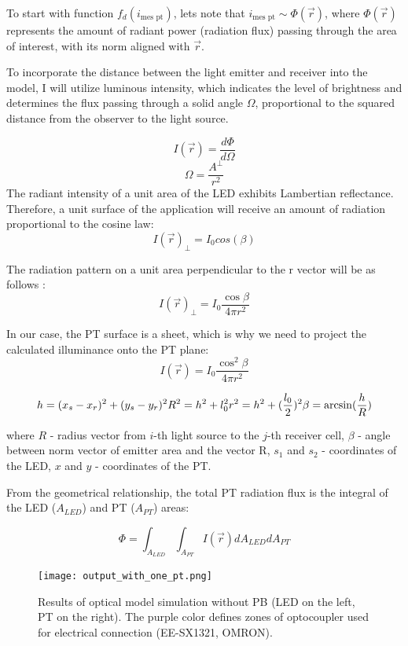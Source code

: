 To start with function $f_d(i_{\text{mes pt}})$, lets note that $i_{\text{mes pt}} 
\sim \Phi(\vec{r})$, where $\Phi(\vec{r})$ represents the amount of radiant power (radiation flux) passing through the area of interest, with its norm aligned with $\vec{r}$.

To incorporate the distance between the light emitter and receiver into the model, I will utilize luminous intensity, which indicates the level of brightness and determines the flux passing through a solid angle 
$\Omega$, proportional to the squared distance from the observer to the light source.

\[I(\vec{r}) = \frac{d\Phi}{d\Omega} \]
\[\Omega = \frac{A^\perp}{r^2}\]
The radiant intensity of a unit area of the LED exhibits Lambertian reflectance. 
Therefore, a unit surface of the application will receive an amount of radiation proportional to the cosine law:
\[I(\vec{r})_\perp = I_{0} cos (\beta)\]

The radiation pattern on a unit area perpendicular to the r vector will be as follows \cite{my_love_pressure_photosensor}:
\[I(\vec{r})_\perp = I_0 \frac{\cos{\beta}}{4 \pi r^2}\]

In our case, the PT surface is a sheet, which is why we need to project the calculated illuminance onto the PT plane: 
$$I(\vec{r}) = I_0 \frac{\cos^2{\beta}}{4 \pi r^2}$$

\[
h = (x_s- x_r)^2 + (y_s - y_r)^2\\
R^2 = h^2 + l_0^2\\
r^2  = h^2 + (\frac{l_0}{2})^2\\
\beta = \arcsin(\frac{h}{R})\\
\]

where $R$ - radius vector from $i$-th light source to the $j$-th receiver cell,
$\beta$ - angle between norm vector of emitter area and the vector R,
$s_1$ and $s_2$ - coordinates of the LED,
$x$ and $y$ - coordinates of the PT.

From the geometrical relationship, the total PT radiation flux is the integral of the LED ($A_{LED}$) and PT ($A_{PT}$) areas:

\begin{equation}
  \Phi = \int_{A_{LED}} \int_{A_{PT}} I(\vec{r})d A_{LED} d A_{PT}
  \label{eq:flux_calc}
\end{equation}
\begin{figure}[H]
    \texttt{[image: output\_with\_one\_pt.png]}
      \centering
      \caption{Results of optical model simulation without PB (LED on the left, PT on the right). The purple color defines zones of optocoupler used for electrical connection (EE-SX1321, OMRON).}
      \label{fig:led_sim_res_one_pt}
\end{figure}

